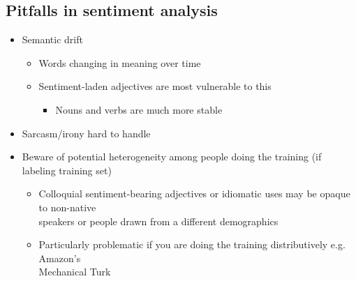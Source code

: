 \documentclass[a4paper]{article}
\begin{document}
\subsection{Pitfalls in sentiment analysis}
\begin{itemize}
    \item Semantic drift
    \begin{itemize}[label=$\circ$]
        \item Words changing in meaning over time
        \item Sentiment-laden adjectives are most vulnerable to this
        \begin{itemize}[label=\tiny$\blacksquare$]
            \item Nouns and verbs are much more stable
        \end{itemize}
    \end{itemize}
    \item Sarcasm/irony hard to handle
    \item Beware of potential heterogeneity among people doing the training (if labeling training set)
    \begin{itemize}[label=$\circ$]
        \item Colloquial sentiment-bearing adjectives or idiomatic uses may be opaque to non-native\\speakers or people drawn from a different demographics
        \item Particularly problematic if you are doing the training distributively e.g. Amazon's\\Mechanical Turk
    \end{itemize}
\end{itemize}
\end{document}
